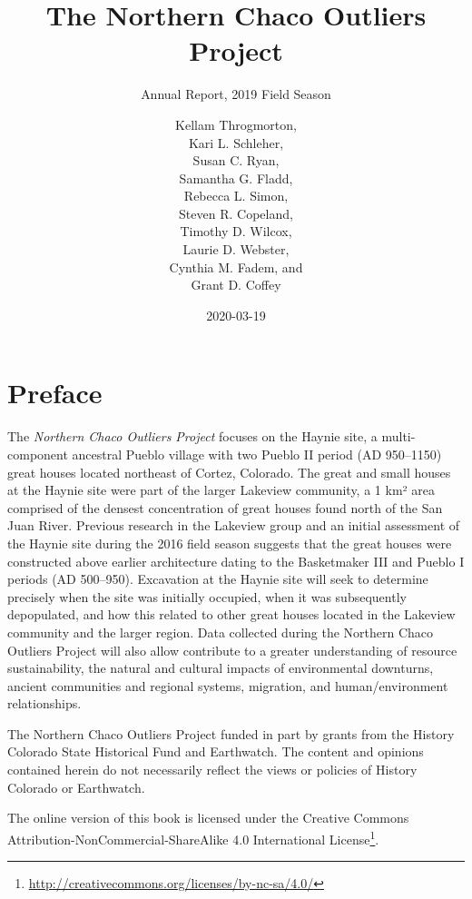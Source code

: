 \documentclass[
  12pt,
]{krantz}
\title{The Northern Chaco Outliers Project}
\subtitle{Annual Report, 2019 Field Season}
\author{Kellam Throgmorton,\\
Kari L. Schleher,\\
Susan C. Ryan,\\
Samantha G. Fladd,\\
Rebecca L. Simon,\\
Steven R. Copeland,\\
Timothy D. Wilcox,\\
Laurie D. Webster,\\
Cynthia M. Fadem, and\\
Grant D. Coffey}
\date{2020-03-19}
\renewcommand{\href}[2]{#2\footnote{\url{#1}}}
\begin{document}
\maketitle

\thispagestyle{empty}

\setlength{\abovedisplayskip}{-5pt}
\setlength{\abovedisplayshortskip}{-5pt}

{
\hypersetup{linkcolor=}
\setcounter{tocdepth}{2}
\tableofcontents
}
\listoftables
\listoffigures
\hypertarget{preface}{%
\chapter{Preface}\label{preface}}

The \emph{Northern Chaco Outliers Project} focuses on the Haynie site, a multi-component ancestral Pueblo village with two Pueblo II period (AD 950--1150) great houses located northeast of Cortez, Colorado. The great and small houses at the Haynie site were part of the larger Lakeview community, a 1 km² area comprised of the densest concentration of great houses found north of the San Juan River. Previous research in the Lakeview group and an initial assessment of the Haynie site during the 2016 field season suggests that the great houses were constructed above earlier architecture dating to the Basketmaker III and Pueblo I periods (AD 500--950). Excavation at the Haynie site will seek to determine precisely when the site was initially occupied, when it was subsequently depopulated, and how this related to other great houses located in the Lakeview community and the larger region. Data collected during the Northern Chaco Outliers Project will also allow contribute to a greater understanding of resource sustainability, the natural and cultural impacts of environmental downturns, ancient communities and regional systems, migration, and human/environment relationships.

The Northern Chaco Outliers Project funded in part by grants from the History Colorado State Historical Fund and Earthwatch. The content and opinions contained herein do not necessarily reflect the views or policies of History Colorado or Earthwatch.

The online version of this book is licensed under the \href{http://creativecommons.org/licenses/by-nc-sa/4.0/}{Creative Commons Attribution-NonCommercial-ShareAlike 4.0 International License}.
\end{document}
